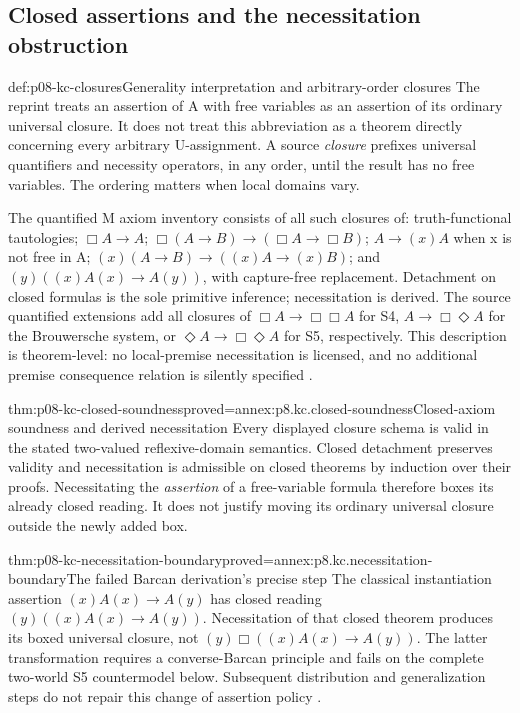 \subsection{Closed assertions and the necessitation obstruction}

\begin{hbdefinition}{def:p08-kc-closures}{Generality interpretation and arbitrary-order closures}
The reprint treats an assertion of A with free variables as an assertion
of its ordinary universal closure. It does not treat this abbreviation
as a theorem directly concerning every arbitrary U-assignment.
A source \emph{closure} prefixes universal quantifiers and necessity
operators, in any order, until the result has no free variables. The
ordering matters when local domains vary.

The quantified M axiom inventory consists of all such closures of:
truth-functional tautologies; \(\Box A\to A\);
\(\Box(A\to B)\to(\Box A\to\Box B)\);
\(A\to(x)A\) when x is not free in A;
\((x)(A\to B)\to((x)A\to(x)B)\); and
\((y)((x)A(x)\to A(y))\), with capture-free replacement.
Detachment on closed formulas is the sole primitive inference;
necessitation is derived. The source quantified extensions add all
closures of \(\Box A\to\Box\Box A\) for S4,
\(A\to\Box\Diamond A\) for the Brouwersche system, or
\(\Diamond A\to\Box\Diamond A\) for S5, respectively.
This description is theorem-level: no local-premise necessitation is
licensed, and no additional premise consequence relation is silently
specified \cite[pp.~68--70]{Kripke1971ConsiderationsReprint}.
\end{hbdefinition}

\begin{hbtheorem}{thm:p08-kc-closed-soundness}{proved=annex:p8.kc.closed-soundness}{Closed-axiom soundness and derived necessitation}
Every displayed closure schema is valid in the stated two-valued
reflexive-domain semantics. Closed detachment preserves validity and
necessitation is admissible on closed theorems by induction over their
proofs. Necessitating the \emph{assertion} of a free-variable formula
therefore boxes its already closed reading. It does not justify moving
its ordinary universal closure outside the newly added box.
\end{hbtheorem}

\begin{hbtheorem}{thm:p08-kc-necessitation-boundary}{proved=annex:p8.kc.necessitation-boundary}{The failed Barcan derivation's precise step}
The classical instantiation assertion
\((x)A(x)\to A(y)\) has closed reading
\((y)((x)A(x)\to A(y))\). Necessitation of that closed
theorem produces its boxed universal closure, not
\((y)\Box((x)A(x)\to A(y))\).
The latter transformation requires a converse-Barcan principle and
fails on the complete two-world S5 countermodel below. Subsequent
distribution and generalization steps do not repair this change of
assertion policy \cite[pp.~68--69]{Kripke1971ConsiderationsReprint}.
\end{hbtheorem}

